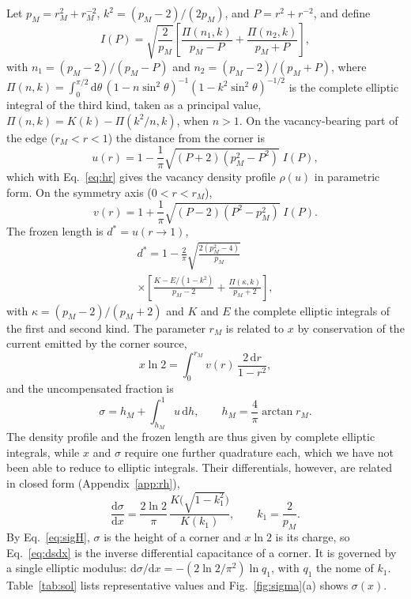 \documentclass[reprint,aps,pre,superscriptaddress,longbibliography,floatfix,amsmath,amssymb]{revtex4-2}
\newcommand{\sig}{\sigma}                %
\newcommand{\dst}{d^{*}}                 %
\newcommand{\rM}{r_{M}}
\newcommand{\pM}{p_{M}}
\newcommand{\dd}{\mathrm{d}}
\begin{document}
Let $\pM=\rM^2+\rM^{-2}$, $k^2=(\pM-2)/(2\pM)$, and $P=r^2+r^{-2}$, and define
\begin{equation}\label{eq:I}
  I(P)=\sqrt{\frac{2}{\pM}}\left[\frac{\Pi(n_1,k)}{\pM-P}+\frac{\Pi(n_2,k)}{\pM+P}\right],
\end{equation}
with $n_{1}=(\pM-2)/(\pM-P)$ and $n_{2}=(\pM-2)/(\pM+P)$,
where $\Pi(n,k)=\int_0^{\pi/2}\dd\theta\,(1-n\sin^2\theta)^{-1}(1-k^2\sin^2\theta)^{-1/2}$ is the complete elliptic integral of the third kind, taken as a principal value, $\Pi(n,k)=K(k)-\Pi(k^2/n,k)$, when $n>1$. On the vacancy-bearing part of the edge ($\rM<r<1$) the distance from the corner is
\begin{equation}\label{eq:u}
  u(r)=1-\frac1\pi\sqrt{(P+2)(\pM^2-P^2)}\;I(P),
\end{equation}
which with Eq.~\eqref{eq:hr} gives the vacancy density profile $\rho(u)$ in parametric form. On the symmetry axis ($0<r<\rM$),
\begin{equation}\label{eq:v}
  v(r)=1+\frac1\pi\sqrt{(P-2)(P^2-\pM^2)}\;I(P).
\end{equation}
The frozen length is $\dst=u(r\to1)$,
\begin{multline}\label{eq:dstar}
  \dst=1-\frac{2}{\pi}\sqrt{\frac{2(\pM^2-4)}{\pM}}\\
  \times\left[\frac{K-E/(1-k^2)}{\pM-2}+\frac{\Pi(\kappa,k)}{\pM+2}\right],
\end{multline}
with $\kappa=(\pM-2)/(\pM+2)$ and $K$ and $E$ the complete elliptic integrals of the first and second kind. The parameter $\rM$ is related to $x$ by conservation of the current emitted by the corner source,
\begin{equation}\label{eq:xcond}
  x\ln2=\int_0^{\rM}v(r)\,\frac{2\,\dd r}{1-r^2},
\end{equation}
and the uncompensated fraction is
\begin{equation}\label{eq:sigexact}
  \sig=h_M+\int_{h_M}^{1}u\,\dd h,\qquad h_M=\frac4\pi\arctan\rM .
\end{equation}
The density profile and the frozen length are thus given by complete elliptic integrals, while $x$ and $\sig$ require one further quadrature each, which we have not been able to reduce to elliptic integrals. Their differentials, however, are related in closed form (Appendix~\ref{app:rh}),
\begin{equation}\label{eq:dsdx}
  \frac{\dd\sig}{\dd x}=\frac{2\ln2}{\pi}\,\frac{K\bigl(\sqrt{1-k_1^2}\bigr)}{K(k_1)},\qquad k_1=\frac{2}{\pM}.
\end{equation}
By Eq.~\eqref{eq:sigH}, $\sig$ is the height of a corner and $x\ln2$ is its charge, so Eq.~\eqref{eq:dsdx} is the inverse differential capacitance of a corner. It is governed by a single elliptic modulus: $\dd\sig/\dd x=-(2\ln2/\pi^2)\ln q_1$, with $q_1$ the nome of $k_1$. Table~\ref{tab:sol} lists representative values and Fig.~\ref{fig:sigma}(a) shows $\sig(x)$.
\end{document}

